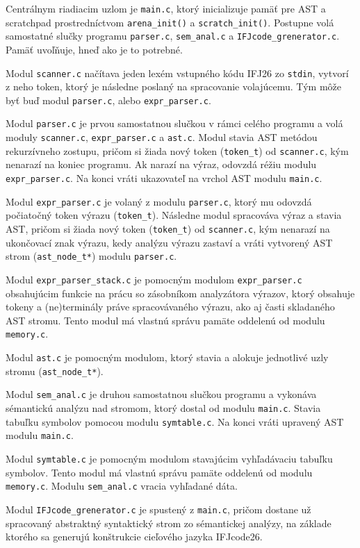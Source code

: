 \vspace{1.5em}
{ \large 
\begin{sloppypar}
Centrálnym riadiacim uzlom je \verb|main.c|, ktorý inicializuje pamäť pre AST a scratchpad prostredníctvom \verb|arena_init()| a \verb|scratch_init()|. Postupne volá samostatné slučky programu \verb|parser.c|, \verb|sem_anal.c| a \verb|IFJcode_grenerator.c|. Pamäť uvoľňuje, hneď ako je to potrebné.

Modul \verb|scanner.c| načítava jeden lexém vstupného kódu IFJ26 zo \verb|stdin|, vytvorí z neho token, ktorý je následne poslaný na spracovanie volajúcemu. Tým môže byť buď modul \verb|parser.c|, alebo \verb|expr_parser.c|. 

Modul \verb|parser.c| je prvou samostatnou slučkou v rámci celého programu a volá moduly \verb|scanner.c|, \verb|expr_parser.c| a \verb|ast.c|. Modul stavia AST metódou rekurzívneho zostupu, pričom si žiada nový token (\verb|token_t|) od \verb|scanner.c|, kým nenarazí na koniec programu. Ak narazí na výraz, odovzdá réžiu modulu \verb|expr_parser.c|. Na konci vráti ukazovateľ na vrchol AST modulu \verb|main.c|.

Modul \verb|expr_parser.c| je volaný z modulu \verb|parser.c|, ktorý mu odovzdá počiatočný token výrazu (\verb|token_t|). Následne modul spracováva výraz a stavia AST, pričom si žiada nový token (\verb|token_t|) od \verb|scanner.c|, kým nenarazí na ukončovací znak výrazu, kedy analýzu výrazu zastaví a vráti vytvorený AST strom (\verb|ast_node_t*|) modulu \verb|parser.c|.

Modul \verb|expr_parser_stack.c| je pomocným modulom \verb|expr_parser.c| obsahujúcim funkcie na prácu so zásobníkom analyzátora výrazov, ktorý obsahuje tokeny a (ne)terminály práve spracovávaného výrazu, ako aj časti skladaného AST stromu. Tento modul má vlastnú správu pamäte oddelenú od modulu \verb|memory.c|.

Modul \verb|ast.c| je pomocným modulom, ktorý stavia a alokuje jednotlivé uzly stromu (\verb|ast_node_t*|).

Modul \verb|sem_anal.c| je druhou samostatnou slučkou programu a vykonáva sémantickú analýzu nad stromom, ktorý dostal od modulu \verb|main.c|. Stavia tabuľku symbolov pomocou modulu \verb|symtable.c|. Na konci vráti upravený AST modulu \verb|main.c|.

Modul \verb|symtable.c| je pomocným modulom stavajúcim vyhľadávaciu tabuľku symbolov. Tento modul má vlastnú správu pamäte oddelenú od modulu \verb|memory.c|. Modulu \verb|sem_anal.c| vracia vyhľadané dáta.

Modul \verb|IFJcode_grenerator.c| je spustený z \verb|main.c|, pričom dostane už spracovaný abstraktný syntaktický strom zo sémantickej analýzy, na základe ktorého sa generujú konštrukcie cieľového jazyka IFJcode26.
\end{sloppypar}
}